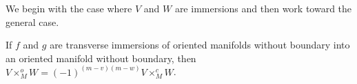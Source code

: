 \medskip

We begin with the case where $V$ and $W$ are immersions and then work toward the general case.

\begin{lemma}\label{L: compare cup and intersection for immersions}
	If $f$ and $g$ are transverse immersions of oriented manifolds without boundary into an oriented manifold without boundary, then $V \times_M ^oW = (-1)^{(m-v)(m-w)} V \times_M ^cW$.
\end{lemma}

